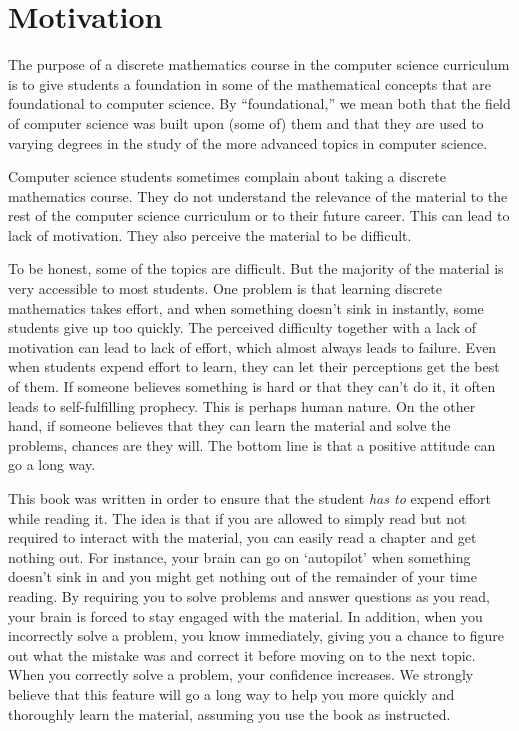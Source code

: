 
\chapter{Motivation}\label{ch:motivation}

The purpose of a discrete mathematics course in the computer science curriculum is
to give students a foundation in some of the mathematical concepts that are
foundational to computer science.   By ``foundational,'' we mean both
that the field of computer science was built upon (some of) them and 
that they are used to varying degrees in the study of the more advanced 
topics in computer science.

Computer science students sometimes complain about taking a discrete mathematics course.
They do not understand the relevance of the material to the rest of the
computer science curriculum or to their future career.
This can lead to lack of motivation.
They also perceive the material to be difficult.  

To be honest, some of the topics are difficult.  But the majority of the
material is very accessible to most students.  
One problem is that learning discrete mathematics takes effort, 
and when something doesn't sink in instantly, some students give up too quickly.  
The perceived difficulty together with a lack of motivation
can lead to lack of effort, which almost always leads to failure.
Even when students expend effort to learn, they can let their perceptions get the
best of them.  If someone believes something is hard or that they can't do it, it
often leads to self-fulfilling prophecy.  This is perhaps human nature.  
On the other hand, if someone believes that they can learn the material and solve the
problems, chances are they will.  The bottom line is that a positive attitude can
go a long way.  


This book was written in order
to ensure that the student {\em has to} expend effort while reading it.  The idea is 
that if you are allowed to simply read but not required to interact with the material,
you can easily read a chapter and get nothing out. 
For instance, your brain can go on `autopilot' when something doesn't sink in 
and you might get nothing out of the remainder of your time reading.  
By requiring you to solve problems and answer questions as you read, 
your brain is forced to stay engaged with the material. 
In addition, when you incorrectly solve a problem, you know immediately, 
giving you a chance to figure out 
what the mistake was and correct it before moving on to the next topic.
When you correctly solve a problem, your confidence increases.  
We strongly believe that this
feature will go a long way to help you more quickly and thoroughly learn the 
material, assuming you use the book as instructed.

